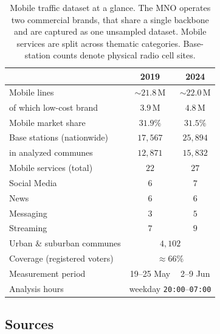 \documentclass[9pt,sigconf,letterpaper]{acmart}
\begin{document}
\begin{table}[t]
\centering
\caption{Mobile traffic dataset at a glance. The \ac{MNO} operates two commercial brands, that share a single backbone and are captured as one unsampled dataset. Mobile services are split across thematic categories. Base-station counts denote physical radio cell sites.\label{tab:dataset}}
\small
\setlength{\tabcolsep}{5pt}
\begin{tabular}{l c c}
 & \textbf{2019} & \textbf{2024} \\
\toprule
Mobile lines                & ${\sim}21.8$\,M & ${\sim}22.0$\,M \\
\quad of which low-cost brand & $3.9$\,M & $4.8$\,M \\
Mobile market share         & $31.9\%$ & $31.5\%$ \\
Base stations (nationwide)  & $17{,}567$ & $25{,}894$ \\
\quad in analyzed communes  & $12{,}871$ & $15{,}832$ \\
\midrule
Mobile services (total)     & $22$ & $27$ \\
\quad Social Media          & $6$ & $7$ \\
\quad News                  & $6$ & $6$ \\
\quad Messaging             & $3$ & $5$ \\
\quad Streaming             & $7$ & $9$ \\
\midrule
Urban \& suburban communes  & \multicolumn{2}{c}{$4{,}102$} \\
Coverage (registered voters) & \multicolumn{2}{c}{${\approx}66\%$} \\
Measurement period          & 19--25 May & 2--9 Jun \\
Analysis hours              & \multicolumn{2}{c}{weekday \texttt{20:00}--\texttt{07:00}} \\
\bottomrule
\end{tabular}
\end{table}

\subsection{Sources}
\label{sec:data-sources}
\end{document}
